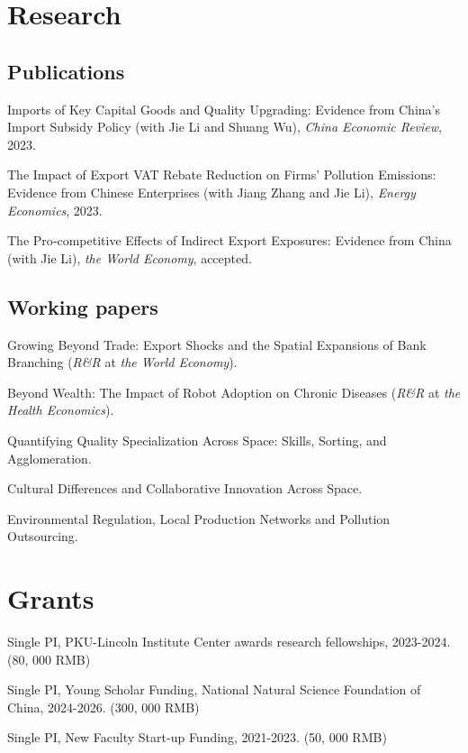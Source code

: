 \documentclass[letterpaper]{article}
\renewenvironment{itemize}{
	\begin{list}{}{
			\setlength{\leftmargin}{1.5em}
		}
	}{
	\end{list}
}
\begin{document}
	\section*{\textbf{Research}}
	\subsection*{Publications}
	
	\begin{itemize}
		\item[1.]   Imports of Key Capital Goods and Quality Upgrading: Evidence from China’s Import Subsidy Policy (with Jie Li and Shuang Wu), {\it  China Economic Review}, 2023. 
			\item[2.]  The Impact of Export VAT Rebate Reduction on Firms' Pollution Emissions: Evidence from Chinese Enterprises  (with Jiang Zhang and Jie Li), {\it  Energy Economics}, 2023.
			\item[3.] The  Pro‐competitive Effects of Indirect Export Exposures: Evidence from China  (with Jie Li),  \textit{the World Economy}, accepted.
	\end{itemize}
	
	\subsection*{Working papers}
	
	\begin{itemize} 
		\item[1.] Growing Beyond Trade: Export Shocks and the Spatial Expansions of Bank Branching  (\textit{R\&R}  at  \textit{the World Economy}).
	\item[2.]  Beyond Wealth: The Impact of Robot Adoption on Chronic Diseases (\textit{R\&R}  at  \textit{the Health Economics}).	
	\item[3.] Quantifying Quality Specialization Across Space: Skills, Sorting, and Agglomeration.
	\item[4.]  Cultural Differences and Collaborative Innovation Across Space.
	\item[5.]  Environmental Regulation, Local Production Networks and Pollution Outsourcing. 
	\end{itemize}

\section*{\textbf{Grants}}
	\begin{itemize} 
 \item[1.] Single PI, PKU-Lincoln Institute Center awards research fellowships, 2023-2024. (80, 000 RMB)
\item[2.] Single PI, Young Scholar Funding, National Natural Science Foundation of China, 2024-2026. (300, 000 RMB)
	\item[3.] Single PI, New Faculty Start-up Funding, 2021-2023. (50, 000 RMB)
	\end{itemize}
\end{document}
